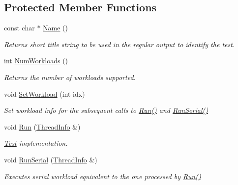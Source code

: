 \subsection*{Protected Member Functions}
\begin{DoxyCompactItemize}
\item 
const char $\ast$ \hyperlink{classTest__PFor__Nested_a62d8e88996141d23d5af4c7d3d00ed4e}{Name} ()
\begin{DoxyCompactList}\small\item\em Returns short title string to be used in the regular output to identify the test. \end{DoxyCompactList}\item 
\hypertarget{classTest__PFor__Nested_a5158c9c794c38ce2f34a3c3672f4c568}{}int \hyperlink{classTest__PFor__Nested_a5158c9c794c38ce2f34a3c3672f4c568}{Num\+Workloads} ()\label{classTest__PFor__Nested_a5158c9c794c38ce2f34a3c3672f4c568}

\begin{DoxyCompactList}\small\item\em Returns the number of workloads supported. \end{DoxyCompactList}\item 
void \hyperlink{classTest__PFor__Nested_a8144237486dd3ba38cecae30d6d58c26}{Set\+Workload} (int idx)
\begin{DoxyCompactList}\small\item\em Set workload info for the subsequent calls to \hyperlink{classTest__PFor__Nested_aec54294278d15e3d49f900fc419ca234}{Run()} and \hyperlink{classTest__PFor__Nested_af72783c3a7cc4f010d0484058af2ed34}{Run\+Serial()} \end{DoxyCompactList}\item 
void \hyperlink{classTest__PFor__Nested_aec54294278d15e3d49f900fc419ca234}{Run} (\hyperlink{structPerf_1_1Test_1_1ThreadInfo}{Thread\+Info} \&)
\begin{DoxyCompactList}\small\item\em \hyperlink{classTest}{Test} implementation. \end{DoxyCompactList}\item 
void \hyperlink{classTest__PFor__Nested_af72783c3a7cc4f010d0484058af2ed34}{Run\+Serial} (\hyperlink{structPerf_1_1Test_1_1ThreadInfo}{Thread\+Info} \&)
\begin{DoxyCompactList}\small\item\em Executes serial workload equivalent to the one processed by \hyperlink{classTest__PFor__Nested_aec54294278d15e3d49f900fc419ca234}{Run()} \end{DoxyCompactList}\end{DoxyCompactItemize}
